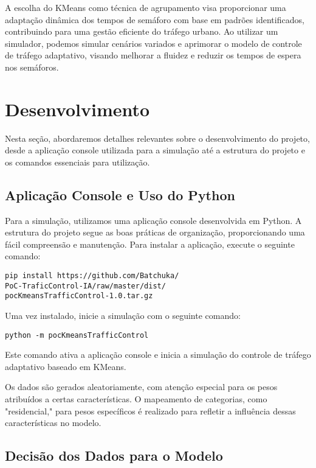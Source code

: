 \documentclass[a4paper, 10pt, conference]{IEEEtran}
\begin{document}
A escolha do KMeans como técnica de agrupamento visa proporcionar uma adaptação dinâmica dos tempos de semáforo com base em padrões identificados, contribuindo para uma gestão eficiente do tráfego urbano. Ao utilizar um simulador, podemos simular cenários variados e aprimorar o modelo de controle de tráfego adaptativo, visando melhorar a fluidez e reduzir os tempos de espera nos semáforos.


\section{Desenvolvimento}

Nesta seção, abordaremos detalhes relevantes sobre o desenvolvimento do projeto, desde a aplicação console utilizada para a simulação até a estrutura do projeto e os comandos essenciais para utilização.

\subsection{Aplicação Console e Uso do Python}

Para a simulação, utilizamos uma aplicação console desenvolvida em Python. A estrutura do projeto segue as boas práticas de organização, proporcionando uma fácil compreensão e manutenção. Para instalar a aplicação, execute o seguinte comando:

\begin{verbatim}
pip install https://github.com/Batchuka/
PoC-TraficControl-IA/raw/master/dist/
pocKmeansTrafficControl-1.0.tar.gz
\end{verbatim}

Uma vez instalado, inicie a simulação com o seguinte comando:

\begin{verbatim}
python -m pocKmeansTrafficControl
\end{verbatim}

Este comando ativa a aplicação console e inicia a simulação do controle de tráfego adaptativo baseado em KMeans.

Os dados são gerados aleatoriamente, com atenção especial para os pesos atribuídos a certas características. O mapeamento de categorias, como "residencial," para pesos específicos é realizado para refletir a influência dessas características no modelo.




\subsection{Decisão dos Dados para o Modelo}
\end{document}
